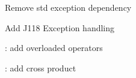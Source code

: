 
\begin{DoxyRefList}
\item[\label{todo__todo000001}%
\hypertarget{todo__todo000001}{}%
Class \hyperlink{class_j118_1_1_math_1_1_matrix}{J118\+:\+:Math\+:\+:Matrix} ]Remove std exception dependency 

Add J118 Exception handling  
\item[\label{todo__todo000002}%
\hypertarget{todo__todo000002}{}%
Class \hyperlink{class_j118_1_1_math_1_1_vector2_d}{J118\+:\+:Math\+:\+:Vector2\+D} ]\+: add overloaded operators 

\+: add cross product 
\end{DoxyRefList}
